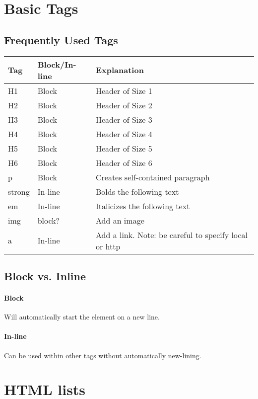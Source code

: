 \documentclass{article}
\begin{document}
\section{Basic Tags}
\subsection{Frequently Used Tags}
\begin{center}
	\begin{tabular}{| l | l | p{10cm} |}
		\hline
		\textbf{Tag} & \textbf{Block/In-line} & \textbf{Explanation} \\ \hline
		H1 & Block & Header of Size 1 \\ \hline
		H2 & Block & Header of Size 2 \\ \hline
		H3 & Block & Header of Size 3 \\ \hline
		H4 & Block & Header of Size 4 \\ \hline
		H5 & Block & Header of Size 5 \\ \hline
		H6 & Block & Header of Size 6 \\ \hline
		p & Block & Creates self-contained paragraph \\ \hline
		strong & In-line & Bolds the following text \\ \hline
		em & In-line & Italicizes the following text \\ \hline
		img & block? & Add an image \\ \hline
		a & In-line & Add a link. Note: be careful to specify local or http \\ \hline
	\end{tabular}
\end{center}

\subsection{Block vs. Inline}
\paragraph*{Block}
Will automatically start the element on a new line.
\paragraph*{In-line}
Can be used within other tags without automatically new-lining.

\section{HTML lists}
\end{document}
